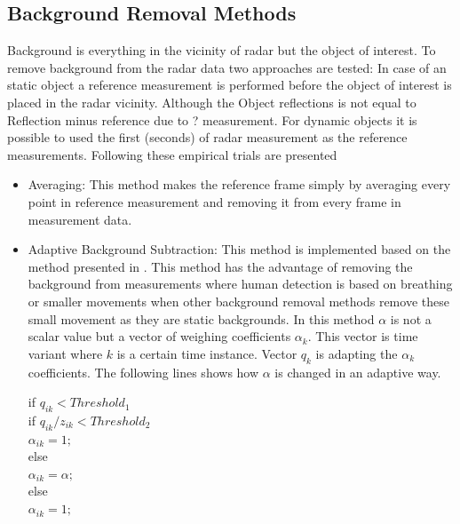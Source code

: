 \subsection{Background Removal Methods}
Background is everything in the vicinity of radar but the object of  interest. To remove background from the radar data two approaches are tested: In case of an static object a reference measurement is performed before the object of interest is placed in the radar vicinity. Although the Object reflections is not equal to Reflection minus reference due to ? measurement.
For dynamic objects it is possible to used the first (seconds) of radar measurement as the reference measurements. Following these empirical trials are presented  
\begin{itemize}
    \item{Averaging}: This method makes the reference frame simply by averaging every point in reference measurement and removing it from every frame in measurement data.
    \item Adaptive Background Subtraction: 
    This method is implemented based on the method presented in \cite{Zetik}. This method has the advantage of removing the background from measurements where human detection is based on breathing or smaller movements when other background removal methods remove these small movement as they are static backgrounds. In this method $\alpha$ is not a scalar value but a vector of weighing coefficients $\alpha_k$. This vector is time variant where $k$ is a certain time instance. Vector $q_k$ is adapting the $\alpha_k$ coefficients. The following lines shows how $\alpha$ is changed in an adaptive way.
 
        \hspace*{5mm}if $q_{ik} < Threshold_1$\\
          \hspace*{15mm} if $q_{ik}/z_{ik} < Threshold_2$\\
               \hspace*{25mm}$ \alpha_{ik} = 1;$\\
            \hspace*{15mm}else\\
                \hspace*{25mm}$\alpha_{ik} = \alpha;$\\
       \hspace*{5mm} else\\
              \hspace*{15mm}$\alpha_{ik} = 1;$\\
  


\end{itemize}
